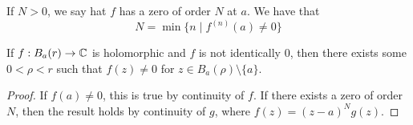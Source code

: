 \begin{definition}
  If $N > 0$, we say hat $f$ has a zero of order $N$ at $a$. We have that
\[
N = \min \{ n \mid f^{(n)}(a) \neq 0 \}
\]
\end{definition}

\begin{proposition}[name=Principle of isolated zeros]
  If $f : B_a(r) \rightarrow \mathbb{C}$ is holomorphic and $f$ is not identically $0$, then there exists some $0 < \rho < r$ such that $f(z) \neq 0$ for $z \in B_a(\rho) \setminus \{ a \}$.
\end{proposition}

\begin{proof}
  If $f(a) \neq 0$, this is true by continuity of $f$.
  If there exists a zero of order $N$, then the result holds by continuity of $g$, where $f(z) = (z-a)^N g(z)$.
\end{proof}

